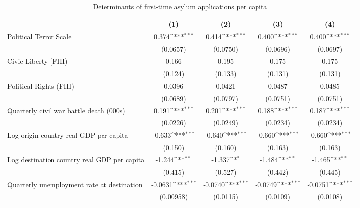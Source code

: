 \begin{table}[htbp]\centering
\def\sym#1{\ifmmode^{#1}\else\(^{#1}\)\fi}
\caption{Determinants of first-time asylum applications per capita}
\begin{tabular}{l*{4}{c}}
\hline\hline
                    &\multicolumn{1}{c}{(1)}         &\multicolumn{1}{c}{(2)}         &\multicolumn{1}{c}{(3)}         &\multicolumn{1}{c}{(4)}         \\
\hline
Political Terror Scale&       0.374\sym{***}&       0.414\sym{***}&       0.400\sym{***}&       0.400\sym{***}\\
                    &    (0.0657)         &    (0.0750)         &    (0.0696)         &    (0.0697)         \\
[1em]
Civic Liberty (FHI) &       0.166         &       0.195         &       0.175         &       0.175         \\
                    &     (0.124)         &     (0.133)         &     (0.131)         &     (0.131)         \\
[1em]
Political Rights (FHI)&      0.0396         &      0.0421         &      0.0487         &      0.0485         \\
                    &    (0.0689)         &    (0.0797)         &    (0.0751)         &    (0.0751)         \\
[1em]
Quarterly civil war battle death (000s)&       0.191\sym{***}&       0.201\sym{***}&       0.188\sym{***}&       0.187\sym{***}\\
                    &    (0.0226)         &    (0.0249)         &    (0.0234)         &    (0.0234)         \\
[1em]
Log origin country real GDP per capita&      -0.633\sym{***}&      -0.640\sym{***}&      -0.660\sym{***}&      -0.660\sym{***}\\
                    &     (0.150)         &     (0.160)         &     (0.163)         &     (0.163)         \\
[1em]
Log destination country real GDP per capita&      -1.244\sym{**} &      -1.337\sym{*}  &      -1.484\sym{**} &      -1.465\sym{**} \\
                    &     (0.415)         &     (0.527)         &     (0.442)         &     (0.445)         \\
[1em]
Quarterly unemployment rate at destination&     -0.0631\sym{***}&     -0.0740\sym{***}&     -0.0749\sym{***}&     -0.0751\sym{***}\\
                    &   (0.00958)         &    (0.0115)         &    (0.0109)         &    (0.0108)         \\

\end{tabular}
\end{table}
